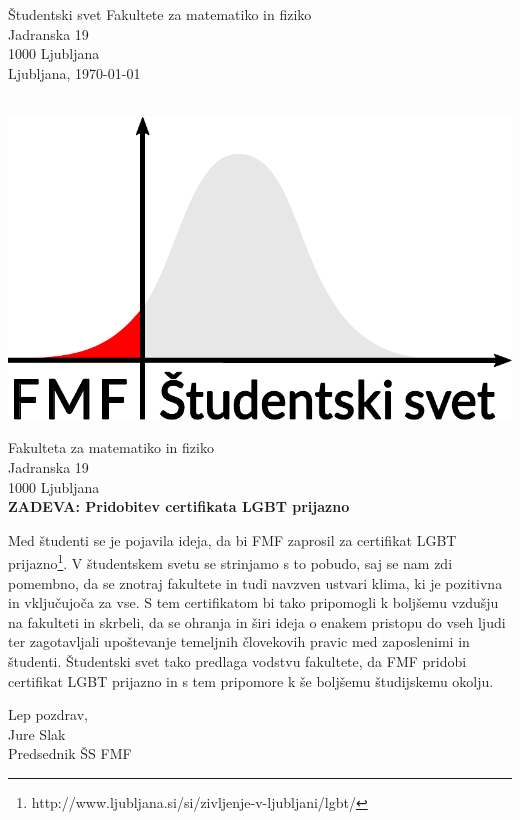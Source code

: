 \documentclass[a4paper,oneside,12pt]{article}
\begin{document}
\begin{minipage}[t]{0.7\linewidth}
Študentski svet Fakultete za matematiko in fiziko \\
Jadranska 19 \\
1000 Ljubljana \\

Ljubljana, \today\\
\end{minipage}%
\begin{minipage}[t]{0.3\linewidth}
  \mbox{} \\[-15pt]
  \hspace*{\fill} \includegraphics[width=0.9\linewidth]{ssfmf_logo_col.pdf}
\end{minipage}

Fakulteta za matematiko in fiziko \\
Jadranska 19 \\
1000 Ljubljana \\

\textbf{ZADEVA: Pridobitev certifikata LGBT prijazno}

Med študenti se je pojavila ideja, da bi FMF zaprosil za certifikat LGBT prijazno\footnote{http://www.ljubljana.si/si/zivljenje-v-ljubljani/lgbt/}.
V študentskem svetu se strinjamo s to pobudo, saj se nam zdi pomembno, da se znotraj
fakultete in tudi navzven ustvari klima, ki je pozitivna in vključujoča za vse. S tem
certifikatom bi tako pripomogli k boljšemu vzdušju na
fakulteti in skrbeli, da se ohranja in širi ideja o enakem pristopu do vseh ljudi ter
zagotavljali upoštevanje temeljnih človekovih pravic med zaposlenimi in študenti.
Študentski svet tako predlaga vodstvu fakultete, da FMF pridobi certifikat
LGBT prijazno in s tem pripomore k še boljšemu študijskemu okolju.

Lep pozdrav, \\
\hspace*{\fill} Jure Slak  \\
\hspace*{\fill} Predsednik ŠS FMF
\end{document}
